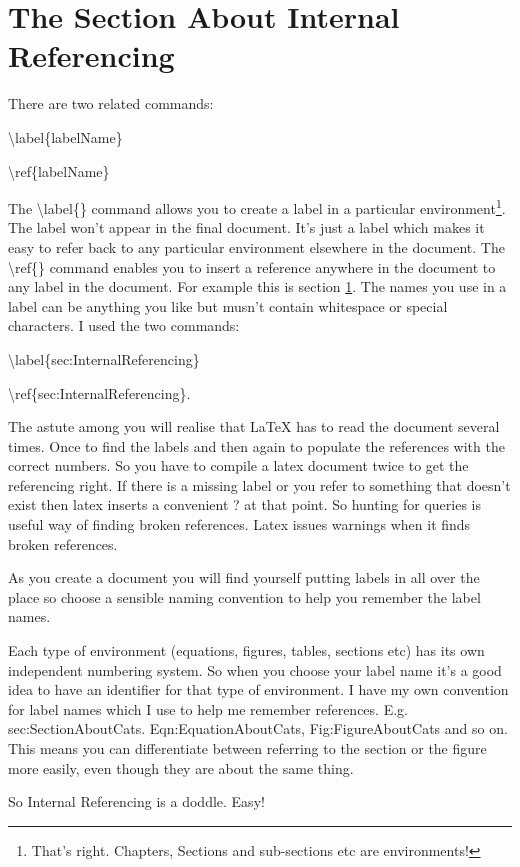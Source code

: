 \section{The Section About Internal Referencing}
\label{sec:InternalReferencing}

There are two related commands:

\vspace*{2ex}

{\textbackslash}label\{labelName\} 

{\textbackslash}ref\{labelName\}

\vspace*{2ex}


The {\textbackslash}label\{\} command allows you to create a label in a particular environment\footnote{That's right. Chapters, Sections and sub-sections etc are environments!}. The label won't appear in the final document. It's just a label which makes it easy to refer back to any particular environment elsewhere in the document. The {\textbackslash}ref\{\} command enables you to insert a reference anywhere in the document to any label in the document.  For example this is section \ref{sec:InternalReferencing}. The names you use in a label can be anything you like but musn't contain whitespace or special characters. I used the two commands:

\vspace*{2ex}

{\textbackslash}label\{sec:InternalReferencing\}

{\textbackslash}ref\{sec:InternalReferencing\}.

\vspace*{2ex}

The astute among you will realise that LaTeX has to read the document several times. Once to find the labels and then again to populate the references with the correct numbers. So you have to compile a latex document twice to get the referencing right. If there is a missing label or you refer to something that doesn't exist then latex inserts a convenient ? at that point. So hunting for queries is useful way of finding broken references. Latex issues warnings when it finds broken references.

As you create a document you will find yourself putting labels in all over the place so choose a sensible naming convention to help you remember the label names.

Each type of environment (equations, figures, tables, sections etc) has its own independent numbering system.  So when you choose your label name it's a good idea to have an identifier for that type of environment.  I have my own convention for label names which I use to help me remember references. E.g.   sec:SectionAboutCats. Eqn:EquationAboutCats,  Fig:FigureAboutCats and so on. This means you can differentiate between referring to the section or the figure more easily, even though they are about the same thing.

So Internal Referencing is a doddle. Easy!